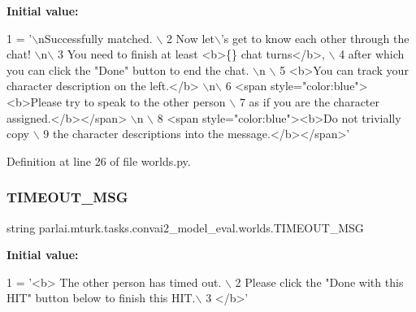 {\bfseries Initial value\+:}
\begin{DoxyCode}
1 =  \textcolor{stringliteral}{'\(\backslash\)nSuccessfully matched. \(\backslash\)}
2 \textcolor{stringliteral}{        Now let\(\backslash\)'s get to know each other through the chat! \(\backslash\)n\(\backslash\)}
3 \textcolor{stringliteral}{        You need to finish at least <b>\{\} chat turns</b>, \(\backslash\)}
4 \textcolor{stringliteral}{        after which you can click the "Done" button to end the chat. \(\backslash\)n \(\backslash\)}
5 \textcolor{stringliteral}{        <b>You can track your character description on the left.</b> \(\backslash\)n\(\backslash\)}
6 \textcolor{stringliteral}{        <span style="color:blue"><b>Please try to speak to the other person \(\backslash\)}
7 \textcolor{stringliteral}{        as if you are the character assigned.</b></span> \(\backslash\)n \(\backslash\)}
8 \textcolor{stringliteral}{        <span style="color:blue"><b>Do not trivially copy \(\backslash\)}
9 \textcolor{stringliteral}{        the character descriptions into the message.</b></span>'}
\end{DoxyCode}


Definition at line 26 of file worlds.\+py.

\mbox{\label{namespaceparlai_1_1mturk_1_1tasks_1_1convai2__model__eval_1_1worlds_ad350ee8d0efcb86baff47a5d45c343d3}} 
\subsubsection{\texorpdfstring{T\+I\+M\+E\+O\+U\+T\+\_\+\+M\+SG}{TIMEOUT\_MSG}}
{\footnotesize\ttfamily string parlai.\+mturk.\+tasks.\+convai2\+\_\+model\+\_\+eval.\+worlds.\+T\+I\+M\+E\+O\+U\+T\+\_\+\+M\+SG}

{\bfseries Initial value\+:}
\begin{DoxyCode}
1 =  \textcolor{stringliteral}{'<b> The other person has timed out. \(\backslash\)}
2 \textcolor{stringliteral}{        Please click the "Done with this HIT" button below to finish this HIT.\(\backslash\)}
3 \textcolor{stringliteral}{        </b>'}
\end{DoxyCode}


